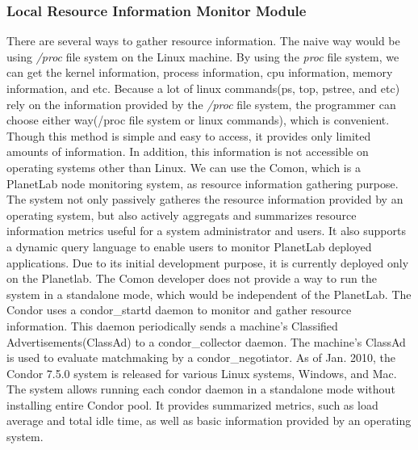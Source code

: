 \documentclass{acm_proc_article-sp}
\begin{document}
\subsubsection{Local Resource Information Monitor Module}
There are several ways to gather resource information. The naive way would be using \textit{/proc} file system on the Linux machine. 
By using the \textit{proc} file system, we can get the kernel information, process information, cpu information, memory information, and etc. 
Because a lot of linux commands(ps, top, pstree, and etc) rely on the information provided by the \textit{/proc} file system,  
the programmer can choose either way(/proc file system or linux commands), which is convenient. 
Though this method is simple and easy to access, it provides only limited amounts of information. In addition, this information is not accessible on operating systems other than Linux.
We can use the Comon\cite{comon}, which  is a PlanetLab\cite{planetlab} node monitoring system, as resource information gathering purpose. The system not only passively gatheres the resource information
provided by an operating system, but also actively aggregats and summarizes resource information metrics useful for a system administrator and users. 
It also supports a dynamic query language to enable users to monitor PlanetLab deployed applications.
Due to its initial development purpose, it is currently deployed only on the Planetlab. The Comon developer does not provide a way to run the system in a standalone mode, which would be independent of the PlanetLab. 
The Condor\cite{condor} uses a condor\_startd daemon to monitor and gather resource information. 
This daemon periodically sends a machine's Classified Advertisements(ClassAd)\cite{classad} to a condor\_collector daemon. 
The machine's ClassAd is used to evaluate matchmaking by a condor\_negotiator. 
As of Jan. 2010, the Condor 7.5.0 system is released for various Linux systems, Windows, and Mac. The system allows running each condor daemon in a standalone mode without
installing entire Condor pool. It provides summarized metrics, such as load average and total idle time, as well as basic information provided by an operating system.
\end{document}
